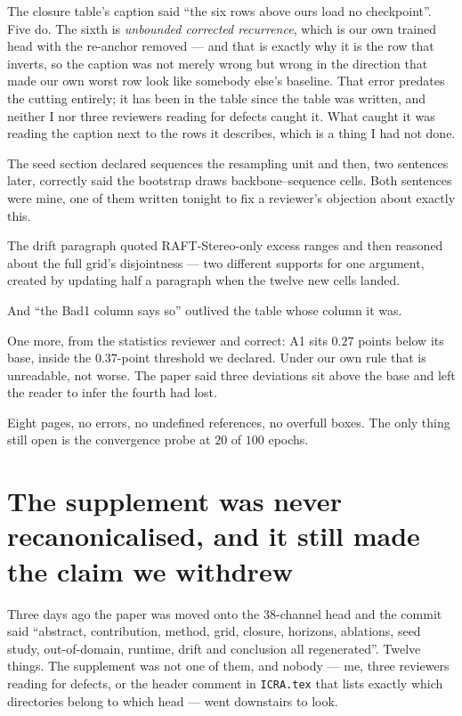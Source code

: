 \documentclass[11pt,a4paper]{article}
\begin{document}
The closure table's caption said ``the six rows above ours load no
checkpoint''. Five do. The sixth is \emph{unbounded corrected recurrence},
which is our own trained head with the re-anchor removed --- and that is
exactly why it is the row that inverts, so the caption was not merely wrong
but wrong in the direction that made our own worst row look like somebody
else's baseline. That error predates the cutting entirely; it has been in the
table since the table was written, and neither I nor three reviewers reading
for defects caught it. What caught it was reading the caption next to the rows
it describes, which is a thing I had not done.

The seed section declared sequences the resampling unit and then, two
sentences later, correctly said the bootstrap draws backbone--sequence cells.
Both sentences were mine, one of them written tonight to fix a reviewer's
objection about exactly this.

The drift paragraph quoted RAFT-Stereo-only excess ranges and then reasoned
about the full grid's disjointness --- two different supports for one argument,
created by updating half a paragraph when the twelve new cells landed.

And ``the Bad1 column says so'' outlived the table whose column it was.

One more, from the statistics reviewer and correct: A1 sits $0.27$ points
below its base, inside the $0.37$-point threshold we declared. Under our own
rule that is unreadable, not worse. The paper said three deviations sit above
the base and left the reader to infer the fourth had lost.

Eight pages, no errors, no undefined references, no overfull boxes. The only
thing still open is the convergence probe at $20$ of $100$ epochs.


\section*{The supplement was never recanonicalised, and it still made the claim we withdrew}

Three days ago the paper was moved onto the $38$-channel head and the commit
said ``abstract, contribution, method, grid, closure, horizons, ablations, seed
study, out-of-domain, runtime, drift and conclusion all regenerated''. Twelve
things. The supplement was not one of them, and nobody --- me, three reviewers
reading for defects, or the header comment in \texttt{ICRA.tex} that lists
exactly which directories belong to which head --- went downstairs to look.
\end{document}
